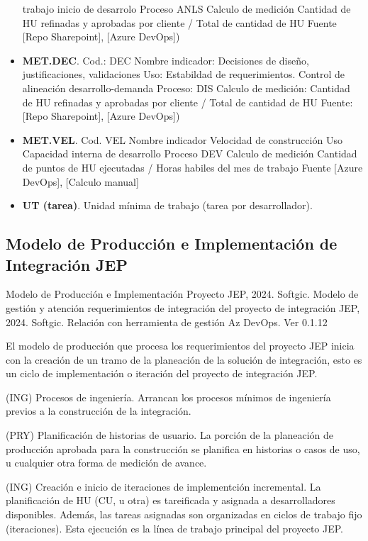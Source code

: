 \documentclass[
  paper=a4,
  ,captions=tableheading
]{scrartcl}
\renewenvironment{quote}{\begin{customblockquote}\list{}{\rightmargin=0em\leftmargin=0em}%
\item\relax\color{blockquote-text}\ignorespaces}{\unskip\unskip\endlist\end{customblockquote}}
\begin{document}
\begin{itemize}
  trabajo inicio de desarrolo Proceso ANLS Calculo de medición Cantidad
  de HU refinadas y aprobadas por cliente / Total de cantidad de HU
  Fuente {[}Repo Sharepoint{]}, {[}Azure DevOps{]})
\item
  \textbf{MET.DEC}. Cod.: DEC Nombre indicador: Decisiones de diseño,
  justificaciones, validaciones Uso: Estabildad de requerimientos.
  Control de alineación desarrollo-demanda Proceso: DIS Calculo de
  medición: Cantidad de HU refinadas y aprobadas por cliente / Total de
  cantidad de HU Fuente: {[}Repo Sharepoint{]}, {[}Azure DevOps{]})\\
\item
  \textbf{MET.VEL}. Cod. VEL Nombre indicador Velocidad de construcción
  Uso Capacidad interna de desarrollo Proceso DEV Calculo de medición
  Cantidad de puntos de HU ejecutadas / Horas habiles del mes de trabajo
  Fuente {[}Azure DevOps{]}, {[}Calculo manual{]}
\item
  \textbf{UT (tarea)}. Unidad mínima de trabajo (tarea por
  desarrollador).
\end{itemize}

\subsection{Modelo de Producción e Implementación de Integración
JEP}\label{sec:modelo-de-producciuxf3n-e-implementaciuxf3n-de-integraciuxf3n-jep}

\begin{quote}
Modelo de Producción e Implementación Proyecto JEP, 2024. Softgic.
Modelo de gestión y atención requerimientos de integración del proyecto
de integración JEP, 2024. Softgic. Relación con herramienta de gestión
Az DevOps. Ver 0.1.12
\end{quote}

El modelo de producción que procesa los requerimientos del proyecto JEP
inicia con la creación de un tramo de la planeación de la solución de
integración, esto es un ciclo de implementación o iteración del proyecto
de integración JEP.

(ING) Procesos de ingeniería. Arrancan los procesos mínimos de
ingeniería previos a la construcción de la integración.

(PRY) Planificación de historias de usuario. La porción de la planeación
de producción aprobada para la construcción se planifica en historias o
casos de uso, u cualquier otra forma de medición de avance.

(ING) Creación e inicio de iteraciones de implementción incremental. La
planificación de HU (CU, u otra) es tareificada y asignada a
desarrolladores disponibles. Además, las tareas asignadas son
organizadas en ciclos de trabajo fijo (iteraciones). Esta ejecución es
la línea de trabajo principal del proyecto JEP.
\end{document}

